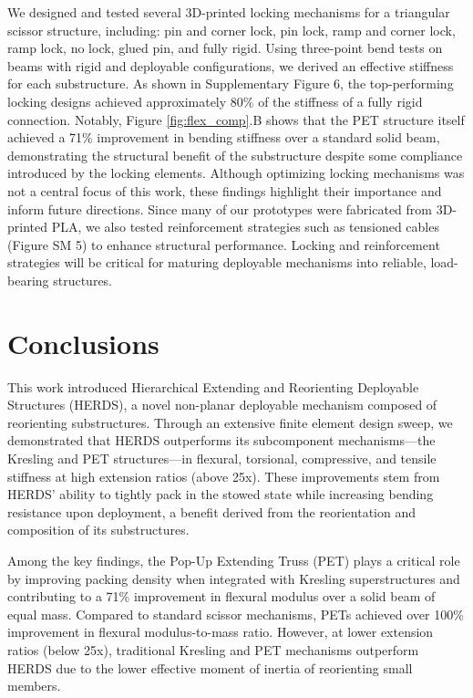 {We designed and tested several 3D-printed locking mechanisms for a triangular scissor structure, including: pin and corner lock, pin lock, ramp and corner lock, ramp lock, no lock, glued pin, and fully rigid. Using three-point bend tests on beams with rigid and deployable configurations, we derived an effective stiffness for each substructure. As shown in Supplementary Figure 6, the top-performing locking designs achieved approximately 80\% of the stiffness of a fully rigid connection. Notably, Figure \ref{fig:flex_comp}.B shows that the PET structure itself achieved a 71\% improvement in bending stiffness over a standard solid beam, demonstrating the structural benefit of the substructure despite some compliance introduced by the locking elements. Although optimizing locking mechanisms was not a central focus of this work, these findings highlight their importance and inform future directions. Since many of our prototypes were fabricated from 3D-printed PLA, we also tested reinforcement strategies such as tensioned cables (Figure SM 5) to enhance structural performance. Locking and reinforcement strategies will be critical for maturing deployable mechanisms into reliable, load-bearing structures.}

\section{Conclusions}\label{sec12}
{
This work introduced Hierarchical Extending and Reorienting Deployable Structures (HERDS), a novel non-planar deployable mechanism composed of reorienting substructures. Through an extensive finite element design sweep, we demonstrated that HERDS outperforms its subcomponent mechanisms—the Kresling and PET structures—in flexural, torsional, compressive, and tensile stiffness at high extension ratios (above 25x). These improvements stem from HERDS’ ability to tightly pack in the stowed state while increasing bending resistance upon deployment, a benefit derived from the reorientation and composition of its substructures.}

{
Among the key findings, the Pop-Up Extending Truss (PET) plays a critical role by improving packing density when integrated with Kresling superstructures and contributing to a 71\% improvement in flexural modulus over a solid beam of equal mass. Compared to standard scissor mechanisms, PETs achieved over 100\% improvement in flexural modulus-to-mass ratio. However, at lower extension ratios (below 25x), traditional Kresling and PET mechanisms outperform HERDS due to the lower effective moment of inertia of reorienting small members.}

